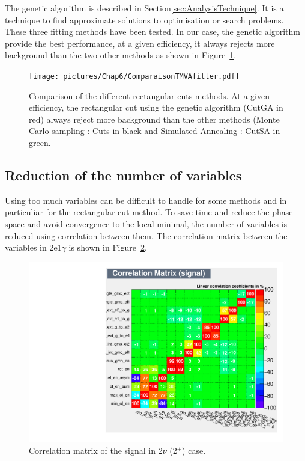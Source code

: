 \documentclass[main.tex]{subfiles}
\begin{document}
\bigskip


\NI The genetic algorithm is described in Section\ref{sec:AnalysisTechnique}. It is a technique to find approximate solutions to optimisation or search problems. These three fitting methods have been tested. In our case, the genetic algorithm provide the best performance, at a given efficiency, it always rejects more background than the two other methods as shown in Figure~\ref{comparisonRC}. 


\begin{figure} [h!]
\begin{center}
\texttt{[image: pictures/Chap6/ComparaisonTMVAfitter.pdf]}
\end{center}
\caption{Comparison of the different rectangular cuts methods. At a given efficiency, the rectangular cut using the genetic algorithm (CutGA in red) always reject more background than the other methods (Monte Carlo sampling : Cuts in black and Simulated Annealing : CutSA in green.}
\label{comparisonRC}
\end{figure}

\FloatBarrier

\subsection{Reduction of the number of variables}\label{sec:ReductionNumberVariables}


\NI Using too much variables can be difficult to handle for some methods and in particuliar for the rectangular cut method. To save time and reduce the phase space and avoid convergence to the local minimal, the number of variables is reduced using correlation between them. The correlation matrix between the variables in 2e1$\gamma$ is shown in Figure~\ref{CorrelationMatrix}.


\bigskip


\begin{figure} [h!]
\begin{center}
\includegraphics[scale=0.45]{pictures/FinalResults/bb2nu2/150/preselection/CorrelationMatrixBB0nu_2_signal.pdf}
\end{center}
\caption{Correlation matrix of the signal in 2$\nu$ (2$^+$) case.}
\label{CorrelationMatrix}
\end{figure}
\end{document}

